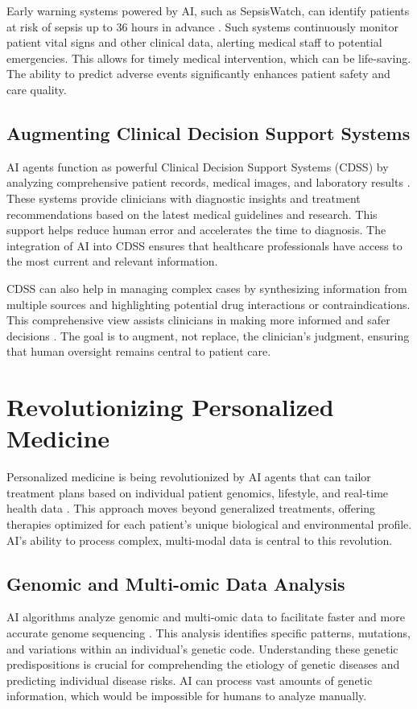 \documentclass[12pt,a4paper]{article}
\begin{document}
Early warning systems powered by AI, such as SepsisWatch, can identify patients at risk of sepsis up to 36 hours in advance \cite{rapidinnovation.io}. Such systems continuously monitor patient vital signs and other clinical data, alerting medical staff to potential emergencies. This allows for timely medical intervention, which can be life-saving. The ability to predict adverse events significantly enhances patient safety and care quality.

\subsection{Augmenting Clinical Decision Support Systems}
AI agents function as powerful Clinical Decision Support Systems (CDSS) by analyzing comprehensive patient records, medical images, and laboratory results \cite{aslm.org}. These systems provide clinicians with diagnostic insights and treatment recommendations based on the latest medical guidelines and research. This support helps reduce human error and accelerates the time to diagnosis. The integration of AI into CDSS ensures that healthcare professionals have access to the most current and relevant information.

CDSS can also help in managing complex cases by synthesizing information from multiple sources and highlighting potential drug interactions or contraindications. This comprehensive view assists clinicians in making more informed and safer decisions \cite{zynxhealth}. The goal is to augment, not replace, the clinician's judgment, ensuring that human oversight remains central to patient care.

\section{Revolutionizing Personalized Medicine}
Personalized medicine is being revolutionized by AI agents that can tailor treatment plans based on individual patient genomics, lifestyle, and real-time health data \cite{medicalfuturist.com}. This approach moves beyond generalized treatments, offering therapies optimized for each patient's unique biological and environmental profile. AI's ability to process complex, multi-modal data is central to this revolution.

\subsection{Genomic and Multi-omic Data Analysis}
AI algorithms analyze genomic and multi-omic data to facilitate faster and more accurate genome sequencing \cite{nih}. This analysis identifies specific patterns, mutations, and variations within an individual's genetic code. Understanding these genetic predispositions is crucial for comprehending the etiology of genetic diseases and predicting individual disease risks. AI can process vast amounts of genetic information, which would be impossible for humans to analyze manually.
\end{document}
